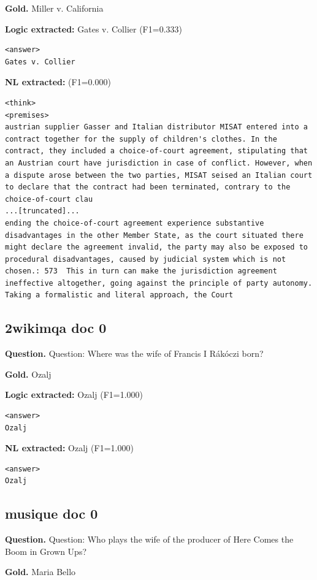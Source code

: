 \documentclass[10pt]{article}
\begin{document}
\textbf{Gold.} Miller v. California

\textbf{Logic extracted:} Gates v. Collier (F1=0.333)
\begin{verbatim}
<answer>
Gates v. Collier
\end{verbatim}
\textbf{NL extracted:}  (F1=0.000)
\begin{verbatim}
<think>
<premises>
austrian supplier Gasser and Italian distributor MISAT entered into a contract together for the supply of children's clothes. In the contract, they included a choice-of-court agreement, stipulating that an Austrian court have jurisdiction in case of conflict. However, when a dispute arose between the two parties, MISAT seised an Italian court to declare that the contract had been terminated, contrary to the choice-of-court clau
...[truncated]...
ending the choice-of-court agreement experience substantive disadvantages in the other Member State, as the court situated there might declare the agreement invalid, the party may also be exposed to procedural disadvantages, caused by judicial system which is not chosen.: 573  This in turn can make the jurisdiction agreement ineffective altogether, going against the principle of party autonomy. Taking a formalistic and literal approach, the Court
\end{verbatim}

\subsection*{2wikimqa doc 0}
\textbf{Question.} Question: Where was the wife of Francis I Rákóczi born?

\textbf{Gold.} Ozalj

\textbf{Logic extracted:} Ozalj (F1=1.000)
\begin{verbatim}
<answer>
Ozalj
\end{verbatim}
\textbf{NL extracted:} Ozalj (F1=1.000)
\begin{verbatim}
<answer>
Ozalj
\end{verbatim}

\subsection*{musique doc 0}
\textbf{Question.} Question: Who plays the wife of the producer of Here Comes the Boom in Grown Ups?

\textbf{Gold.} Maria Bello
\end{document}
